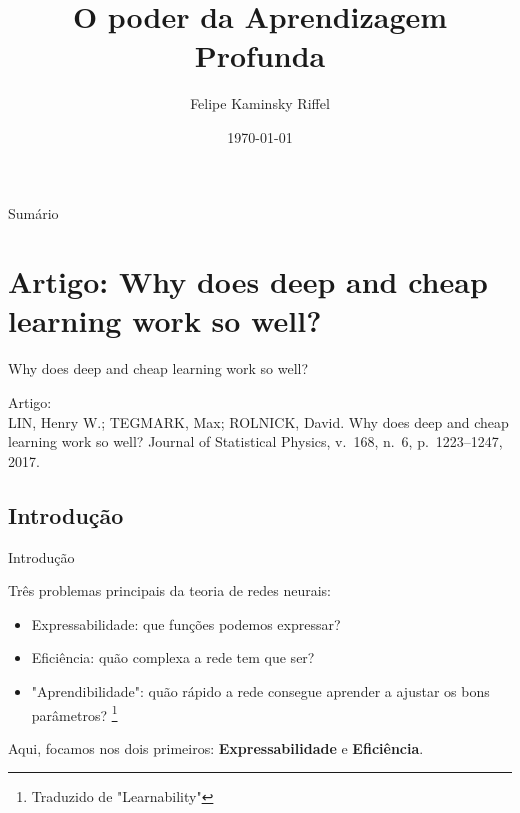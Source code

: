 \documentclass{beamer}
\title{O poder da Aprendizagem Profunda}
\author{Felipe Kaminsky Riffel}
\date{\today}
\institute{Universidade Federal de Santa Catarina}
\begin{document}
{ 
\frame{\titlepage}}

\begin{frame}{Sumário}
    \tableofcontents
\end{frame}
  

\section{Artigo: Why does deep and cheap learning work so well?}    
\begin{frame}
\tableofcontents[currentsection]
\end{frame}

\begin{frame}{Why does deep and cheap learning work so well?}

Artigo: \\

LIN, Henry W.; TEGMARK, Max; ROLNICK, David. Why does deep and cheap learning work so well? Journal of Statistical Physics, v. 168, n. 6, p. 1223–1247, 2017.

\end{frame}

\subsection{Introdução}
\begin{frame}
    \tableofcontents[currentsection]
\end{frame}


\begin{frame}{Introdução}

Três problemas principais da teoria de redes neurais: \\

\begin{itemize}
    \item Expressabilidade: que funções podemos expressar? \pause \\
    \item Eficiência: quão complexa a rede tem que ser? \pause \\
    \item "Aprendibilidade": quão rápido a rede consegue aprender a ajustar os bons parâmetros? \footnote[frame]{Traduzido de "Learnability"} \pause
\end{itemize}

Aqui, focamos nos dois primeiros: \textbf{Expressabilidade} e \textbf{Eficiência}.
\end{frame} 
\end{document}
